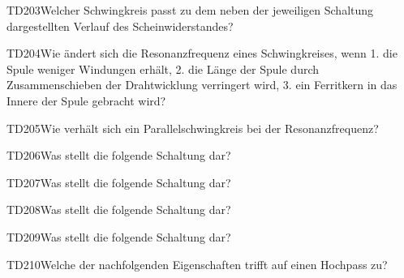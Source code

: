 \begin{question}{TD203}{Welcher Schwingkreis passt zu dem neben der jeweiligen Schaltung dargestellten Verlauf des Scheinwiderstandes?}
\answer{}
\answer{}
\answer{}
\answer{}
\end{question}

\begin{question}{TD204}{Wie ändert sich die Resonanzfrequenz eines Schwingkreises, wenn 1. die Spule weniger Windungen erhält, 2. die Länge der Spule durch Zusammenschieben der Drahtwicklung verringert wird, 3. ein Ferritkern in das Innere der Spule gebracht wird?}
\end{question}

\begin{question}{TD205}{Wie verhält sich ein Parallelschwingkreis bei der Resonanzfrequenz?}
\end{question}

\begin{question}{TD206}{Was stellt die folgende Schaltung dar?}
\end{question}

\begin{question}{TD207}{Was stellt die folgende Schaltung dar?}
\end{question}

\begin{question}{TD208}{Was stellt die folgende Schaltung dar?}
\end{question}

\begin{question}{TD209}{Was stellt die folgende Schaltung dar?}
\end{question}

\begin{question}{TD210}{Welche der nachfolgenden Eigenschaften trifft auf einen Hochpass zu?}
\end{question}

